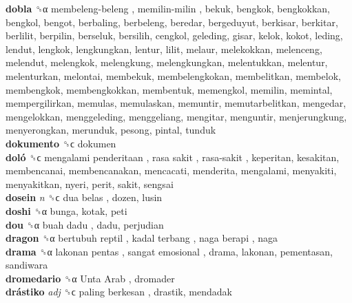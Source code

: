 \textbf{dobla} ␝α   membeleng-beleng ,  memilin-milin , bekuk, bengkok, bengkokkan, bengkol, bengot, berbaling, berbeleng, beredar, bergeduyut, berkisar, berkitar, berlilit, berpilin, berseluk, bersilih, cengkol, geleding, gisar, kelok, kokot, leding, lendut, lengkok, lengkungkan, lentur, lilit, melaur, melekokkan, melenceng, melendut, melengkok, melengkung, melengkungkan, melentukkan, melentur, melenturkan, melontai, membekuk, membelengkokan, membelitkan, membelok, membengkok, membengkokkan, membentuk, memengkol, memilin, memintal, mempergilirkan, memulas, memulaskan, memuntir, memutarbelitkan, mengedar, mengelokkan, menggeleding, menggeliang, mengitar, menguntir, menjerungkung, menyerongkan, merunduk, pesong, pintal, tunduk  \\
\textbf{dokumento} ␝ϲ  dokumen  \\
\textbf{doló} ␝ϲ   mengalami penderitaan ,  rasa sakit ,  rasa-sakit , keperitan, kesakitan, membencanai, membencanakan, mencacati, menderita, mengalami, menyakiti, menyakitkan, nyeri, perit, sakit, sengsai  \\
\textbf{dosein} \emph{n}  ␝ϲ   dua belas , dozen, lusin  \\
\textbf{doshi} ␝α  bunga, kotak, peti  \\
\textbf{dou} ␝α   buah dadu , dadu, perjudian  \\
\textbf{dragon} ␝α   bertubuh reptil ,  kadal terbang ,  naga berapi , naga  \\
\textbf{drama} ␝α   lakonan pentas ,  sangat emosional , drama, lakonan, pementasan, sandiwara  \\
\textbf{dromedario} ␝α   Unta Arab , dromader  \\
\textbf{drástiko} \emph{adj}  ␝ϲ   paling berkesan , drastik, mendadak  \\
